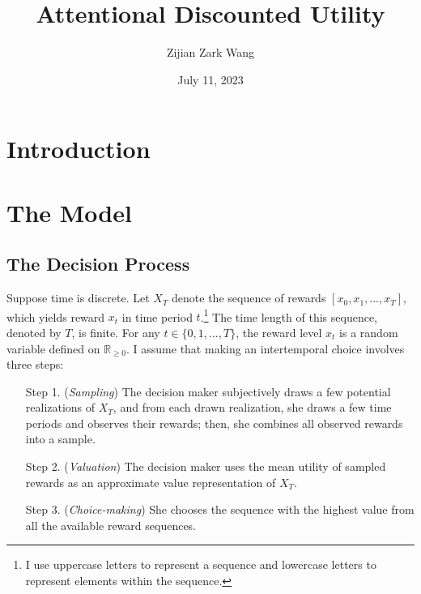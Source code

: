 \documentclass[
  12pt,
]{article}
\title{Attentional Discounted Utility}
\author{Zijian Zark Wang}
\date{July 11, 2023}
\begin{document}
\maketitle

\hypertarget{introduction}{%
\section{Introduction}\label{introduction}}

\hypertarget{the-model}{%
\section{The Model}\label{the-model}}

\hypertarget{the-decision-process}{%
\subsection{The Decision Process}\label{the-decision-process}}

Suppose time is discrete. Let \(X_T\) denote the sequence of rewards
\([x_0,x_1,...,x_T]\), which yields reward \(x_t\) in time period
\(t\).\footnote{I use uppercase letters to represent a sequence and
  lowercase letters to represent elements within the sequence.} The time
length of this sequence, denoted by \(T\), is finite. For any
\(t \in \{0,1,...,T\}\), the reward level \(x_t\) is a random variable
defined on \(\mathbb{R}_{\geq 0}\). I assume that making an
intertemporal choice involves three steps:

\begin{itemize}[leftmargin=2cm]
\item[Step 1.] (\textit{Sampling}) The decision maker subjectively draws a few potential realizations of $X_T$, and from each drawn realization, she draws a few time periods and observes their rewards; then, she combines all observed rewards into a sample.

\item[Step 2.] (\textit{Valuation}) The decision maker uses the mean utility of sampled rewards as an approximate value representation of $X_T$.

\item[Step 3.] (\textit{Choice-making}) She chooses the sequence with the highest value from all the available reward sequences.
\end{itemize}
\end{document}
